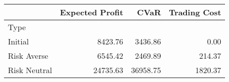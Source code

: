 \begin{tabular}{lrrr}
\toprule
{} &  Expected Profit &      CVaR &  Trading Cost \\
\midrule
Type         &                  &           &               \\
Initial      &          8423.76 &   3436.86 &          0.00 \\
Risk Averse  &          6545.42 &   2469.89 &        214.37 \\
Risk Neutral &         24735.63 &  36958.75 &       1820.37 \\
\bottomrule
\end{tabular}
